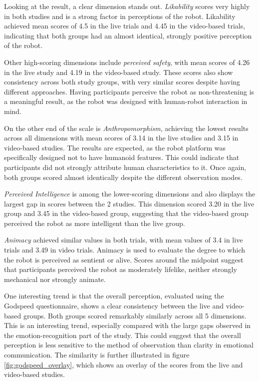 
 
\newpage


Looking at the result, a clear dimension stands out. \textit{Likability} scores very highly in both studies and is a strong factor in perceptions of the robot. Likability achieved mean scores of 4.5 in the live trials and 4.45 in the video-based trials, indicating that both groups had an almost identical, strongly positive perception of the robot.

Other high-scoring dimensions include \textit{perceived safety}, with mean scores of 4.26 in the live study and 4.19 in the video-based study. These scores also show consistency across both study groups, with very similar scores despite having different approaches. Having participants perceive the robot as non-threatening is a meaningful result, as the robot was designed with human-robot interaction in mind.

On the other end of the scale is \textit{Anthropomorphism}, achieving the lowest results across all dimensions with mean scores of 3.14 in the live studies and 3.15 in video-based studies. The results are expected, as the robot platform was specifically designed not to have humanoid features. This could indicate that participants did not strongly attribute human characteristics to it. Once again, both groups scored almost identically despite the different observation modes.

\textit{Perceived Intelligence} is among the lower-scoring dimensions and also displays the largest gap in scores between the 2 studies. This dimension scored 3.20 in the live group and 3.45 in the video-based group, suggesting that the video-based group perceived the robot as more intelligent than the live group.

\textit{Animacy} achieved similar values in both trials, with mean values of 3.4 in live trials and 3.49 in video trials. Animacy is used to evaluate the degree to which the robot is perceived as sentient or alive. Scores around the midpoint suggest that participants perceived the robot 
as moderately lifelike, neither strongly mechanical nor strongly animate.

One interesting trend is that the overall perception, evaluated using the Godspeed questionnaire, shows a clear consistency between the live and video-based groups. Both groups scored remarkably similarly across all 5 dimensions. This is an interesting trend, especially compared with the large gaps observed in the emotion-recognition part of the study. This could suggest that the overall perception is less sensitive to the method of observation than clarity in emotional communication. The similarity is further illustrated in figure \ref{fig:godspeed_overlay}, which shows an overlay of the scores from the live and video-based studies. 

